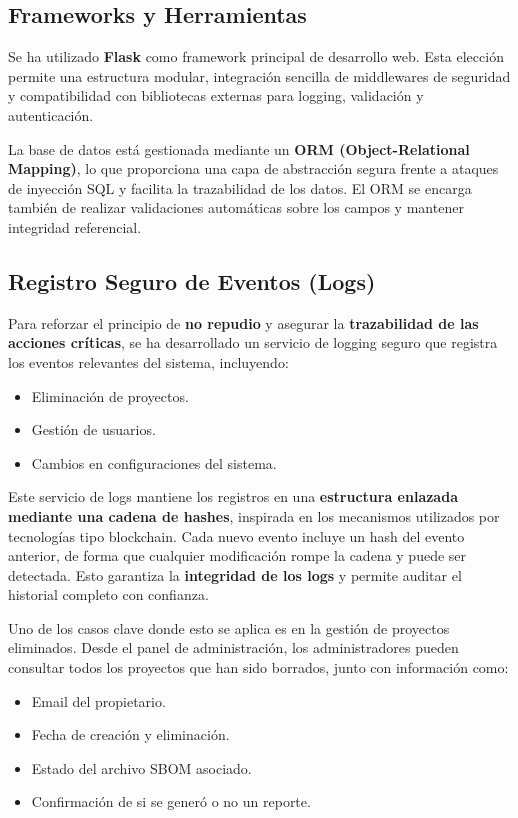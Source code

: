 \documentclass[11pt]{article}
\begin{document}
\subsection{Frameworks y Herramientas}

Se ha utilizado \textbf{Flask} como framework principal de desarrollo web. Esta elección permite una estructura modular, integración sencilla de middlewares de seguridad y compatibilidad con bibliotecas externas para logging, validación y autenticación.

La base de datos está gestionada mediante un \textbf{ORM (Object-Relational Mapping)}, lo que proporciona una capa de abstracción segura frente a ataques de inyección SQL y facilita la trazabilidad de los datos. El ORM se encarga también de realizar validaciones automáticas sobre los campos y mantener integridad referencial.

\subsection{Registro Seguro de Eventos (Logs)}

Para reforzar el principio de \textbf{no repudio} y asegurar la \textbf{trazabilidad de las acciones críticas}, se ha desarrollado un servicio de logging seguro que registra los eventos relevantes del sistema, incluyendo:

\begin{itemize}
    \item Eliminación de proyectos.
    \item Gestión de usuarios.
    \item Cambios en configuraciones del sistema.
\end{itemize}

Este servicio de logs mantiene los registros en una \textbf{estructura enlazada mediante una cadena de hashes}, inspirada en los mecanismos utilizados por tecnologías tipo blockchain. Cada nuevo evento incluye un hash del evento anterior, de forma que cualquier modificación rompe la cadena y puede ser detectada. Esto garantiza la \textbf{integridad de los logs} y permite auditar el historial completo con confianza.

Uno de los casos clave donde esto se aplica es en la gestión de proyectos eliminados. Desde el panel de administración, los administradores pueden consultar todos los proyectos que han sido borrados, junto con información como:

\begin{itemize}
    \item Email del propietario.
    \item Fecha de creación y eliminación.
    \item Estado del archivo SBOM asociado.
    \item Confirmación de si se generó o no un reporte.
\end{itemize}
\end{document}
